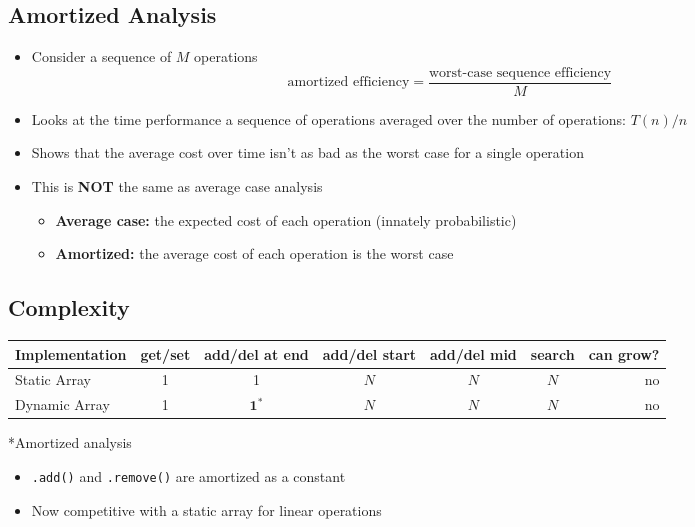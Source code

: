 \documentclass[10pt]{article}
\begin{document}
\subsection*{Amortized Analysis}
\begin{itemize}
    \item Consider a sequence of $M$ operations
    $$
    \text{amortized efficiency} = \frac{\text{worst-case sequence efficiency}}{M}
    $$
    \item Looks at the time performance a sequence of operations averaged over the number of operations: $T(n)/n$
    \item Shows that the average cost over time isn't as bad as the worst case for a single operation
    \item This is \textbf{NOT} the same as average case analysis
    \begin{itemize}
        \item \textbf{Average case:} the expected cost of each operation (innately probabilistic)
        \item \textbf{Amortized:} the average cost of each operation is the worst case
    \end{itemize}
\end{itemize}

\subsection*{Complexity}
\begin{center}
    \begin{tabular}{lcccccr} \toprule
        Implementation & get/set & add/del at end & add/del start & add/del mid & search & can grow? \\ \midrule
        Static Array & 1 & 1 & $N$ & $N$ & $N$ & no \\
        Dynamic Array & 1 & $\mathbf{1^*}$ & $N$ & $N$ & $N$ & no \\ \bottomrule
    \end{tabular}
    \begin{center}*Amortized analysis\end{center}
\end{center}
\begin{itemize}
    \item \texttt{.add()} and \texttt{.remove()} are amortized as a constant
    \item Now competitive with a static array for linear operations
\end{itemize}
\end{document}
